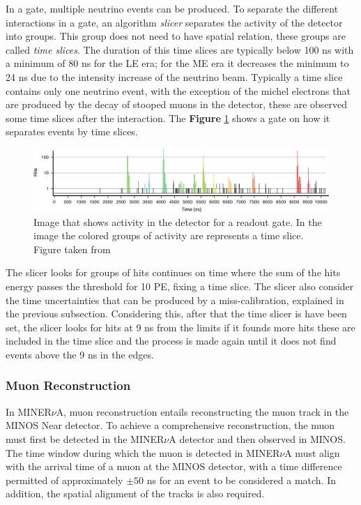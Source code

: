 In a gate, multiple neutrino events can be produced. To separate the different interactions in a gate, an algorithm \textit{ slicer} separates the activity of the detector into groups. This group does not need to have spatial relation, these groups are called \textit{time slices}. The duration of this time slices are typically below 100 ns with a minimum of 80 ns for the LE era; for the ME era it decreases the minimum to 24 ns due to the intensity increase of the neutrino beam. Typically a time slice contains only one neutrino event, with the exception of the michel electrons that are produced by the decay of stooped muons in the detector, these are observed some time slices after the interaction. The \textbf{Figure} \ref{fig:MnvExp:MnvDetector:CalibrationOneGate} shows a gate on how it separates events by time slices.

\begin{figure}[!htb]
    \centering
    \includegraphics[scale=1]{Figures/Chapter2/OneGate.jpg}
    \caption{Image that shows activity in the detector for a readout gate. In the image the colored groups of activity are represents a time slice. Figure taken from \cite{MINERvA}}
    \label{fig:MnvExp:MnvDetector:CalibrationOneGate}
\end{figure}
The slicer looks for groups of hits continues on time where the sum of the hits energy passes the threshold for 10 PE, fixing a time slice. The slicer also consider the time uncertainties that can be produced by a miss-calibration, explained in the previous subsection. Considering this, after that the time slicer is have been set, the slicer looks for hits at 9 ns from the limits if it founds more hits these are included in the time slice and the process is made again until it does not find events above the 9 ns in the edges. 

\subsubsection{Muon Reconstruction}
\label{Cap:MnvExp:MnvDetector:DataReconstruction:MuonReconstruction}
In MINER$\nu$A, muon reconstruction entails reconstructing the muon track in the MINOS Near detector. To achieve a comprehensive reconstruction, the muon must first be detected in the MINER$\nu$A detector and then observed in MINOS. The time window during which the muon is detected in MINER$\nu$A must align with the arrival time of a muon at the MINOS detector, with a time difference permitted of approximately $\pm50$ ns for an event to be considered a match. In addition, the spatial alignment of the tracks is also required. 

